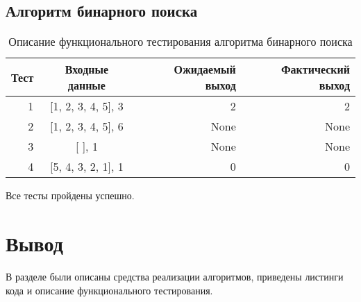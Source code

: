 \subsection{Алгоритм бинарного поиска}

\begin{table}[h!]
    \centering
    \caption{Описание функционального тестирования алгоритма бинарного поиска}
    \begin{tabular}{|r|c|r|r|}
        \hline
        \textbf{Тест} & \textbf{Входные данные} & \textbf{Ожидаемый выход} & \textbf{Фактический выход} \\
        \hline
        1 & [1, 2, 3, 4, 5], 3 & 2 & 2 \\
        \hline
        2 & [1, 2, 3, 4, 5], 6 & None & None \\
        \hline
        3 & [ ], 1 & None & None \\
        \hline
        4 & [5, 4, 3, 2, 1], 1 & 0 & 0 \\
        \hline
    \end{tabular}
    \label{tab:binary}
\end{table}

Все тесты пройдены успешно.

\section*{Вывод}

В разделе были описаны средства реализации алгоритмов, приведены листинги кода и описание функционального тестирования.
